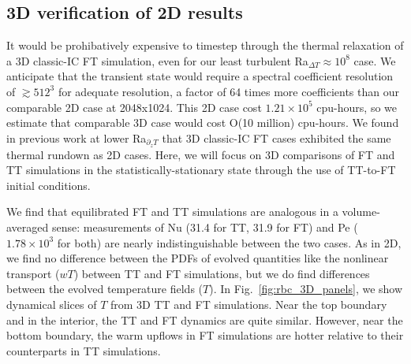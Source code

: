 \documentclass[aps, pre, onecolumn, nofootinbib, notitlepage, groupedaddress, amsfonts, amssymb, amsmath, longbibliography, superscriptaddress]{revtex4-1}
\begin{document}
\subsection{3D verification of 2D results}
It would be prohibatively expensive to timestep through the thermal relaxation of a 3D classic-IC FT simulation, even for our least turbulent Ra$_{\Delta T} \approx 10^8$ case.
We anticipate that the transient state would require a spectral coefficient resolution of $\gtrsim 512^3$ for adequate resolution, a factor of 64 times more coefficients than our comparable 2D case at 2048x1024.
This 2D case cost $1.21 \times 10^5$ cpu-hours, so we estimate that comparable 3D case would cost O(10 million) cpu-hours.
We found in previous work \cite{anders&all2018} at lower Ra$_{\partial_z T}$ that 3D classic-IC FT cases exhibited the same thermal rundown as 2D cases.
Here, we will focus on 3D comparisons of FT and TT simulations in the statistically-stationary state through the use of TT-to-FT initial conditions.

We find that equilibrated FT and TT simulations are analogous in a volume-averaged sense: measurements of Nu (31.4 for TT, 31.9 for FT) and Pe ($1.78 \times 10^3$ for both) are nearly indistinguishable between the two cases.
As in 2D, we find no difference between the PDFs of evolved quantities like the nonlinear transport ($wT$) between TT and FT simulations, but we do find differences between the evolved temperature fields ($T$).
In Fig.~\ref{fig:rbc_3D_panels}, we show dynamical slices of $T$ from 3D TT and FT simulations.
Near the top boundary and in the interior, the TT and FT dynamics are quite similar.
However, near the bottom boundary, the warm upflows in FT simulations are hotter relative to their counterparts in TT simulations.
\end{document}
